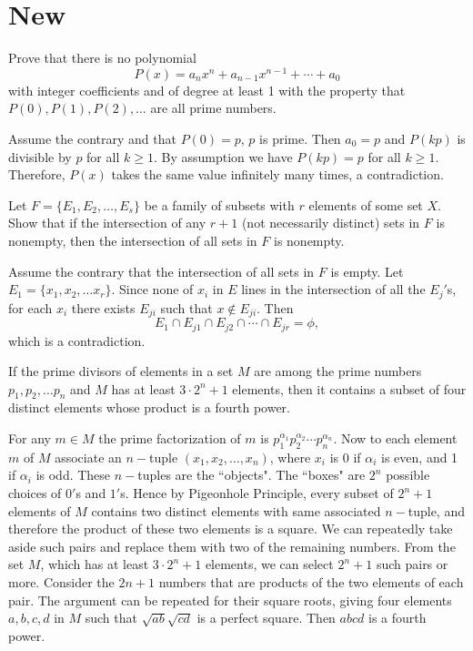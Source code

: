 \section{New}

\begin{example}
    Prove that there is no polynomial $$P(x)=a_nx^n+a_{n-1}x^{n-1}+\cdots+a_0$$ with integer coefficients and of degree at least 1 with the property that $P(0), P(1), P(2), \ldots$ are all prime numbers.
\end{example}
\begin{solution}
    Assume the contrary and that $P(0)=p$, $p$ is prime. Then $a_0=p$ and $P(kp)$ is divisible by $p$ for all $k\geq 1$. By assumption we have $P(kp)=p$ for all $k\geq 1$. Therefore, $P(x)$ takes the same value infinitely many times, a contradiction.
\end{solution}

\begin{example}
    Let $F=\{E_1, E_2, \ldots, E_s\}$ be a family of subsets with $r$ elements of some set $X$. Show that if the intersection of any $r+1$ (not necessarily distinct) sets in $F$ is nonempty, then the intersection of all sets in $F$ is nonempty.
\end{example}
\begin{solution}
    Assume the contrary that the intersection of all sets in $F$ is empty. Let $E_1=\{x_1, x_2, \ldots x_r\}$. Since none of $x_i$ in $E$ lines in the intersection of all the $E_j'$s, for each $x_i$ there exists $E_{ji}$ such that $x\notin E_{ji}$. Then
    $$E_1\cap E_{j1}\cap E_{j2}\cap \cdots\cap E_{jr}=\phi,$$
    which is a contradiction.
\end{solution}

\question If the prime divisors of elements in a set $M$ are among the prime numbers $p_1,p_2,\ldots p_n$ and $M$ has at least $3\cdot 2^n+1$ elements, then it contains a subset of four distinct elements whose product is a fourth power.

\begin{solution}
    For any $m\in M$ the prime factorization of $m$ is $p_1^{\alpha_1}p_2^{\alpha_2}\cdots p_n^{\alpha_n}$. Now to each element $m$ of $M$ associate an $n-$tuple $(x_1,x_2,\ldots,x_n)$, where $x_i$ is 0 if $\alpha_i$ is even, and 1 if  $\alpha_i$ is odd. These $n-$tuples are the ``objects". The ``boxes" are $2^n$ possible choices of $0'$s and $1'$s. Hence by Pigeonhole Principle, every subset of $2^n+1$ elements of $M$ contains two distinct elements with same associated $n-$tuple, and therefore the product of these two elements is a square. We can repeatedly take aside such pairs and replace them with two of the remaining numbers. From the set $M$, which has at least $3\cdot 2^n+1$ elements, we can select $2^n+1$ such pairs or more. Consider the $2n+1$ numbers that are products of the two elements
    of each pair. The argument can be repeated for their square roots, giving four elements
    $a, b, c, d$ in $M$ such that $\sqrt{ab}\sqrt{cd}$ is a perfect square. Then $abcd$ is a fourth power.
\end{solution}

